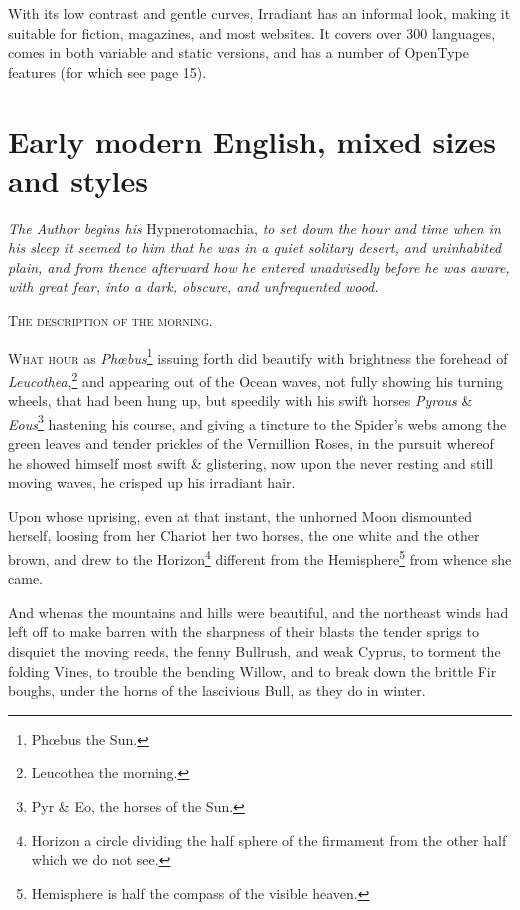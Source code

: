 \documentclass[12pt]{book}
\begin{document}
With its low contrast and gentle curves, Irradiant has an informal look, 
making it suitable for fiction, magazines, and most websites.
It covers over 300 languages, comes in both variable and static versions,
and has a number of OpenType features (for which see page 15).

\section*{Early modern English, mixed sizes and styles}

\noindent\textit{The Author begins his} Hypnerotomachia, \textit{to set
  down the hour and time when in his sleep it seemed to him that
  he was in a quiet solitary desert, and uninhabited plain, and
  from thence afterward how he entered unadvisedly before he was
  aware, with great fear, into a dark, obscure, and unfrequented
  wood.}

\begin{center}
  \textsc{The description of the morning.}
\end{center}

\lettrine[lines=5, loversize=0.1, findent=5pt, nindent=0em, image=true]{W}{hat hour} as \textit{Phœbus}\footnote{Phœbus the Sun.} issuing
forth did beautify with brightness the forehead of
\textit{Leucothea},\footnote{Leucothea the morning.} and appearing out
of the Ocean waves, not fully showing his turning wheels, that had
been hung up, but speedily with his swift horses \textit{Pyrous} \&
\textit{Eous}\footnote{Pyr \& Eo, the horses of the Sun.} hastening
his course, and giving a tincture to the Spider’s webs among the
green leaves and tender prickles of the Vermillion Roses, in the
pursuit whereof he showed himself most swift \& glistering, now upon
the never resting and still moving waves, he crisped up his irradiant
hair.

Upon whose uprising, even at that instant, the unhorned Moon
dismounted herself, loosing from her Chariot her two horses, the one
white and the other brown, and drew to the Horizon\footnote{Horizon
  a circle dividing the half sphere of the firmament from the other
  half which we do not see.} different from the
Hemisphere\footnote{Hemisphere is half the compass of the visible
  heaven.} from whence she came.

And whenas the mountains and hills were beautiful, and the
northeast winds had left off to make barren with the sharpness of
their blasts the tender sprigs to disquiet the moving reeds, the
fenny Bullrush, and weak Cyprus, to torment the folding Vines, to
trouble the bending Willow, and to break down the brittle Fir
boughs, under the horns of the lascivious Bull, as they do in
winter.
\end{document}
